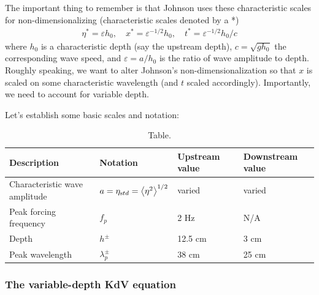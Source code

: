 \documentclass[12pt]{article}
\newcommand{\mean}[1]{\left< #1 \right>}
\newcommand{\eps}{\varepsilon}
\newcommand{\etastd}{\eta_{\text std}}
\begin{document}
The important thing to remember is that Johnson uses these characteristic scales for non-dimensionalizing (characteristic scales denoted by a *)
\begin{align}
\eta^* = \eps h_0 , \quad
x^* = \eps^{-1/2} h_0 , \quad
t^* = \eps^{-1/2} h_0/c
\end{align}
where $h_0$ is a characteristic depth (say the upstream depth), $c = \sqrt{g h_0}$ the corresponding wave speed, and $\eps = a / h_0$ is the ratio of wave amplitude to depth. Roughly speaking, we want to alter Johnson's non-dimensionalization so that $x$ is scaled on some characteristic wavelength (and $t$ scaled accordingly). Importantly, we need to account for variable depth.

Let's establish some basic scales and notation:
\begin{table}[h]%
\begin{center}
\caption{Table.}
\label{scale_table}
\begin{tabular}{l l l l}
\hline Description & Notation & Upstream  value \,\, & Downstream value \\
\hline
Characteristic wave amplitude	& $a = \etastd = \mean{\eta^2}^{1/2}$	& varied	& varied \\
Peak forcing frequency		& $f_p$				& 2 Hz		& N/A \\
Depth					& $h^{\pm}$			& 12.5 cm		& 3 cm \\
Peak wavelength			& $\lambda_p^{\pm}$	& 38 cm		& 25 cm \\
\end{tabular}
\end{center}
\end{table}

\subsubsection{The variable-depth KdV equation}
\end{document}
